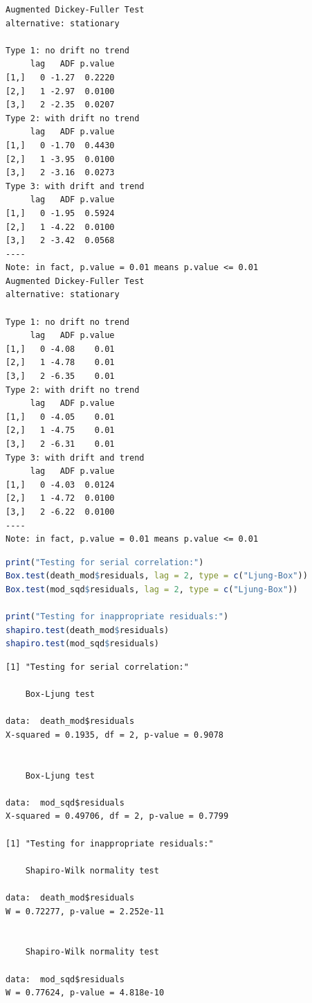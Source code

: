 \documentclass[a4paper]{article}
\begin{document}
\label{org317cf14}
\begin{verbatim}
Augmented Dickey-Fuller Test 
alternative: stationary 
 
Type 1: no drift no trend 
     lag   ADF p.value
[1,]   0 -1.27  0.2220
[2,]   1 -2.97  0.0100
[3,]   2 -2.35  0.0207
Type 2: with drift no trend 
     lag   ADF p.value
[1,]   0 -1.70  0.4430
[2,]   1 -3.95  0.0100
[3,]   2 -3.16  0.0273
Type 3: with drift and trend 
     lag   ADF p.value
[1,]   0 -1.95  0.5924
[2,]   1 -4.22  0.0100
[3,]   2 -3.42  0.0568
---- 
Note: in fact, p.value = 0.01 means p.value <= 0.01 
Augmented Dickey-Fuller Test 
alternative: stationary 
 
Type 1: no drift no trend 
     lag   ADF p.value
[1,]   0 -4.08    0.01
[2,]   1 -4.78    0.01
[3,]   2 -6.35    0.01
Type 2: with drift no trend 
     lag   ADF p.value
[1,]   0 -4.05    0.01
[2,]   1 -4.75    0.01
[3,]   2 -6.31    0.01
Type 3: with drift and trend 
     lag   ADF p.value
[1,]   0 -4.03  0.0124
[2,]   1 -4.72  0.0100
[3,]   2 -6.22  0.0100
---- 
Note: in fact, p.value = 0.01 means p.value <= 0.01
\end{verbatim}

\begin{lstlisting}[language=r,label=lst:orgf5d1ea2,caption={Question 3: Post-regression residual testing},captionpos=b,numbers=none]
print("Testing for serial correlation:")
Box.test(death_mod$residuals, lag = 2, type = c("Ljung-Box"))
Box.test(mod_sqd$residuals, lag = 2, type = c("Ljung-Box"))

print("Testing for inappropriate residuals:")
shapiro.test(death_mod$residuals)
shapiro.test(mod_sqd$residuals)
\end{lstlisting}

\label{org6abd0f4}
\begin{verbatim}
[1] "Testing for serial correlation:"

	Box-Ljung test

data:  death_mod$residuals
X-squared = 0.1935, df = 2, p-value = 0.9078


	Box-Ljung test

data:  mod_sqd$residuals
X-squared = 0.49706, df = 2, p-value = 0.7799

[1] "Testing for inappropriate residuals:"

	Shapiro-Wilk normality test

data:  death_mod$residuals
W = 0.72277, p-value = 2.252e-11


	Shapiro-Wilk normality test

data:  mod_sqd$residuals
W = 0.77624, p-value = 4.818e-10
\end{verbatim}
\end{document}
